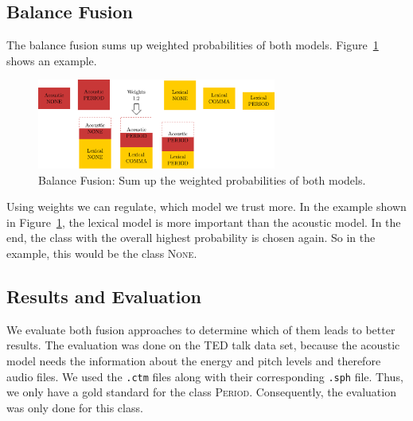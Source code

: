 \subsection{Balance Fusion}
The balance fusion sums up weighted probabilities of both models.
Figure~\ref{fig:fusion_2} shows an example.
\begin{figure}[ht]
    \centering
    \includegraphics[width=0.7\textwidth]{img/fusion_2.pdf}
    \caption{Balance Fusion: Sum up the weighted probabilities of both models.}
    \label{fig:fusion_2}
\end{figure}
Using weights we can regulate, which model we trust more.
In the example shown in Figure~\ref{fig:fusion_2}, the lexical model is more important than the acoustic model.
In the end, the class with the overall highest probability is chosen again.
So in the example, this would be the class \textsc{None}.

\subsection{Results and Evaluation}
We evaluate both fusion approaches to determine which of them leads to better results.
The evaluation was done on the TED talk data set, because the acoustic model needs the information about the energy and pitch levels and therefore audio files.
We used the \texttt{.ctm} files along with their corresponding \texttt{.sph} file.
Thus, we only have a gold standard for the class \textsc{Period}.
Consequently, the evaluation was only done for this class.

